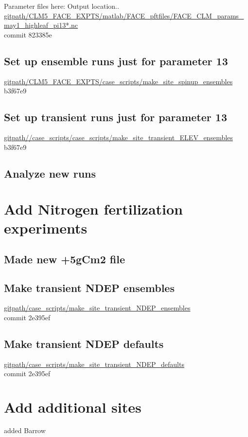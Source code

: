 \documentclass{article}
\begin{document}
Parameter files here:
Output location..\\
{\color{red}\small{\url{gitpath/CLM5_FACE_EXPTS/matlab/FACE_pftfiles/FACE_CLM_params_may1_highleaf_pi13*.nc }}} \\
commit 823385e  

\subsection{Set up ensemble runs just for parameter 13}
{\color{blue}\small{\url{gitpath/CLM5_FACE_EXPTS/case_scripts/make_site_spinup_ensembles}} }\\
b3f67e9  

\subsection{Set up transient runs just for parameter 13}
{\color{blue}\small{\url{gitpath//case_scripts/case_scripts/make_site_transient_ELEV_ensembles}}}\\
b3f67e9


\subsection{Analyze new runs}


\section{Add Nitrogen fertilization experiments}
\subsection{Made new +5gCm2 file}

\subsection{Make transient NDEP ensembles}
{\color{blue}\small{\url{gitpath/case_scripts/make_site_transient_NDEP_ensembles}}}\\ 
commit 2e395ef  

\subsection{Make transient NDEP defaults}
{\color{blue}\small{\url{gitpath/case_scripts/make_site_transient_NDEP_defaults}}}\\ 
commit 2e395ef  


 
\section{Add additional sites}
added Barrow
\end{document}
